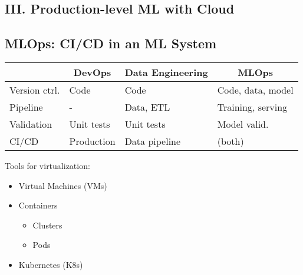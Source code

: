 \documentclass[10pt,landscape,letterpaper]{cheatsheet}
\begin{document}
\begin{multicols}{3}
\section{III. Production-level ML with Cloud}

\subsection{MLOps: CI/CD in an ML System}

\begin{tabular}{@{}llll@{}}
\toprule
                  & \multicolumn{1}{c}{\textbf{DevOps}} & \multicolumn{1}{c}{\textbf{Data Engineering}} & \multicolumn{1}{c}{\textbf{MLOps}} \\ \midrule
Version ctrl.   & Code                                & Code                                          & Code, data, model                  \\
Pipeline          & -                                   & Data, ETL                                     & Training, serving                  \\
Validation        & Unit tests                          & Unit tests                                    & Model valid.                   \\
CI/CD & Production                          & Data pipeline                                 & (both)                             \\ \bottomrule
\end{tabular}

\vskip0.1in

Tools for virtualization:

\begin{itemize}
    \item Virtual Machines (VMs)
    \item Containers
    \begin{itemize}
        \item Clusters
        \item Pods
    \end{itemize}
    \item Kubernetes (K8s)
\end{itemize}

\vskip0.1in


\end{multicols}
\end{document}
